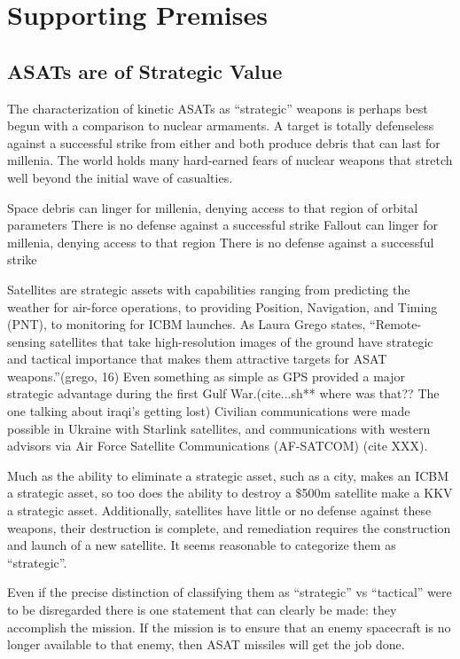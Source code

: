 \section{Supporting Premises}

\subsection{ASATs are of Strategic Value}

The characterization of kinetic ASATs as ``strategic'' weapons is
perhaps best begun with a comparison to nuclear armaments.  A target
is totally defenseless against a successful strike from either and
both produce debris that can last for millenia.  The world holds many
hard-earned fears of nuclear weapons that stretch well beyond the
initial wave of casualties.


Space debris can linger for millenia, denying access to that region of
orbital parameters There is no defense against a successful strike
Fallout can linger for millenia, denying access to that region There
is no defense against a successful strike


Satellites are strategic assets with capabilities ranging from
predicting the weather for air-force operations, to providing
Position, Navigation, and Timing (PNT), to monitoring for ICBM
launches.  As Laura Grego states, ``Remote-sensing satellites that
take high-resolution images of the ground have strategic and tactical
importance that makes them attractive targets for ASAT
weapons.''(grego, 16) Even something as simple as GPS provided a major
strategic advantage during the first Gulf War.(cite...sh** where was
that?? The one talking about iraqi's getting lost) Civilian
communications were made possible in Ukraine with Starlink satellites,
and communications with western advisors via Air Force Satellite
Communications (AF-SATCOM) (cite XXX).

Much as the ability to eliminate a strategic asset, such as a city,
makes an ICBM a strategic asset, so too does the ability to destroy a
$\$$500m satellite make a KKV a strategic asset.  Additionally,
satellites have little or no defense against these weapons, their
destruction is complete, and remediation requires the construction and
launch of a new satellite.  It seems reasonable to categorize them as
``strategic''.

Even if the precise distinction of classifying them as ``strategic''
vs ``tactical'' were to be disregarded there is one statement that can
clearly be made: they accomplish the mission.  If the mission is to
ensure that an enemy spacecraft is no longer available to that enemy,
then ASAT missiles will get the job done.

